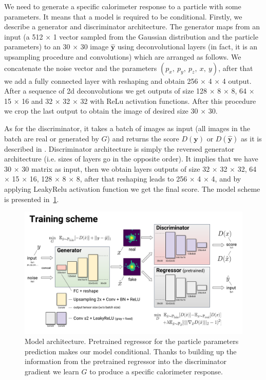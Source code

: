 We need to generate a specific calorimeter response to a particle with some parameters. It means that a model is required to be conditional.
Firstly, we describe a generator and discriminator architecture. The generator maps from an input (a 512 $\times$ 1 vector sampled from the Gaussian distribution and the particle parameters) to an 30 $\times$ 30 image $\hat{\textbf{y}}$ using deconvolutional layers (in fact, it is an upsampling procedure and convolutions) which are arranged as follows. We concatenate the noise vector and the parameters $(p_x,~ p_y,~ p_z,~ x,~ y)$, after that we add a fully connected layer with reshaping and obtain 256 $\times$ 4 $\times$ 4 output. After a sequence of 2d deconvolutions we get outputs of size  128 $\times$ 8 $\times$ 8, 64 $\times$ 15 $\times$ 16 and 32 $\times$ 32 $\times$ 32  with ReLu activation functions. After this procedure we crop the last output to obtain the image of desired size 30 $\times$ 30.

As for the discriminator, it takes a batch of images as input (all images in the batch are real or generated by $G$) and returns the score $D(\textbf{y})$ or $D(\hat{\textbf{y}})$ as it is described in \cite{arjovsky2017wasserstein}. Discriminator architecture is simply the reversed generator architecture (i.e. sizes of layers go in the opposite order). It implies that we have 30 $\times$ 30 matrix as input, then we obtain layers outputs of size 32 $\times$ 32 $\times$ 32, 64 $\times$ 15 $\times$ 16, 128 $\times$ 8 $\times$  8, after that reshaping leads to 256 $\times$ 4 $\times$ 4, and by applying LeakyRelu activation function we get the final score. The model scheme is presented in~\cref{fig:model}.

\begin{figure}
\centering
\includegraphics[width=1\textwidth]{figures/model_architecture.pdf}
\caption{Model architecture. Pretrained regressor for the particle parameters prediction makes our model conditional. Thanks to building up the information from the pretrained regressor into the discriminator gradient we learn $G$ to produce a specific calorimeter response.}\label{fig:model}
\end{figure}

